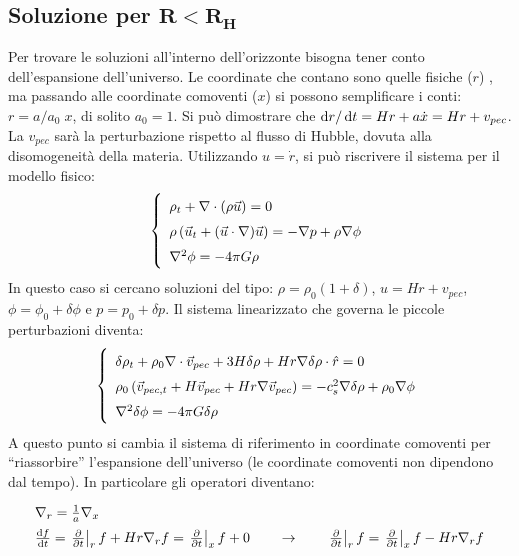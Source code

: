 \subsection{Soluzione per $\mathbf{R < R_H}$}
Per trovare le soluzioni all'interno dell'orizzonte bisogna tener conto dell'espansione dell'universo. Le coordinate che contano sono quelle fisiche ($r$) , ma passando alle coordinate comoventi ($x$) si possono semplificare i conti: $r=a/a_0 \; x$, di solito $a_0=1$. Si può dimostrare che $\operatorname{d}\!{r}/\operatorname{d}\!{t} = Hr + a\dot{x} = Hr+ v_{pec}$. La $v_{pec}$ sarà la perturbazione rispetto al flusso di Hubble, dovuta alla disomogeneità della materia. Utilizzando $u=\dot{r}$, si può riscrivere il sistema per il modello fisico:
\begin{equation}\left\{
    \def\arraystretch{1.5}
    \begin{array}{l}
        \rho_t + \nabla\cdot (\rho \vec{u}) =0 \\
        \rho \left ( \vec{u}_t + (\vec{u} \cdot \nabla) \vec{u} \right) = -\nabla p +\rho \nabla \phi \\
        \nabla^2 \phi = - 4 \pi G \rho
    \end{array}\right.
\end{equation}
In questo caso si cercano soluzioni del tipo: $\rho = \rho_0 (1+\delta)$, $u=Hr+v_{pec}$, $\phi=\phi_0+\delta\phi$ e $p=p_0+\delta p$. Il sistema linearizzato che governa le piccole perturbazioni diventa:
\begin{equation}\left\{
    \def\arraystretch{1.5}
    \begin{array}{l}
        \delta\rho_t + \rho_0 \nabla\cdot\vec{v}_{pec} + 3H \delta\rho + Hr \nabla \delta\rho \cdot \hat{r} =0 \\
        \rho_0 \left ( \vec{v}_{pec, t} + H \vec{v}_{pec}+ Hr\nabla\vec{v}_{pec}\right ) = -c_s^2 \nabla\delta\rho +\rho_0\nabla\phi \\
        \nabla^2 \delta \phi = -4\pi G \delta\rho
    \end{array}\right.
\end{equation}
A questo punto si cambia il sistema di riferimento in coordinate comoventi per ``riassorbire'' l'espansione dell'universo (le coordinate comoventi non dipendono dal tempo). In particolare gli operatori diventano:
\begin{equation*}
    \def\arraystretch{1.5}
    \begin{array}{l}
        \nabla_r = \frac{1}{a}\nabla_x \\
        \frac{\d{f}}{\d{t}} = \left. \frac{\partial}{\partial t} \right|_r f + Hr \nabla_r f = \left. \frac{\partial}{\partial t} \right|_x f + 0 \qquad \rightarrow \qquad \left. \frac{\partial}{\partial t} \right|_r f = \left. \frac{\partial}{\partial t} \right|_x f - Hr \nabla_r f  
    \end{array}
\end{equation*}
